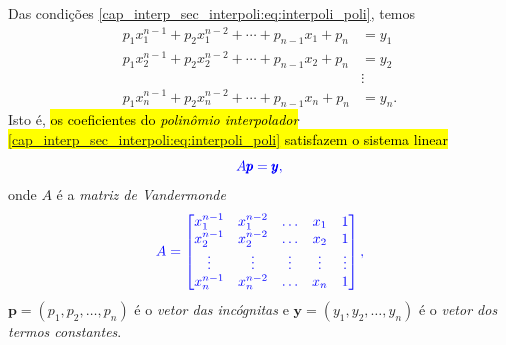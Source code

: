 Das condições \eqref{cap_interp_sec_interpoli:eq:interpoli_poli}, temos
\begin{equation}
  \begin{aligned}\label{cap_interp_sec_interpoli:eq:interpoli_sis}
    p_1x_1^{n-1} + p_2x_1^{n-2} + \cdots + p_{n-1}x_1 + p_n &= y_1 \\
    p_1x_2^{n-1} + p_2x_2^{n-2} + \cdots + p_{n-1}x_2 + p_n &= y_2 \\
    &\vdots \\
    p_1x_n^{n-1} + p_2x_n^{n-2} + \cdots + p_{n-1}x_n + p_n &= y_n.
  \end{aligned}
\end{equation}
Isto é, \hl{os coeficientes do \emph{polinômio interpolador} {\eqref{cap_interp_sec_interpoli:eq:interpoli_poli}} satisfazem o sistema linear}
\begin{equation}\color{blue}A\pmb{p} = \pmb{y},
\end{equation}
onde $A$ é a \emph{matriz de Vandermonde}{\vandermonde}
\begin{equation}\color{blue}A =
  \begin{bmatrix}
    x_1^{n-1} & x_1^{n-2} & \ldots & x_1 & 1 \\
    x_2^{n-1} & x_2^{n-2} & \ldots & x_2 & 1 \\
    \vdots  & \vdots  & \vdots  & \vdots & \vdots \\
    x_n^{n-1} & x_n^{n-2} & \ldots & x_n & 1
  \end{bmatrix},
\end{equation}
$\pmb{p} = (p_1, p_2, \ldots, p_n)$ é o \emph{vetor das incógnitas} e $\pmb{y} = (y_1, y_2, \ldots, y_n)$ é o \emph{vetor dos termos constantes}.

